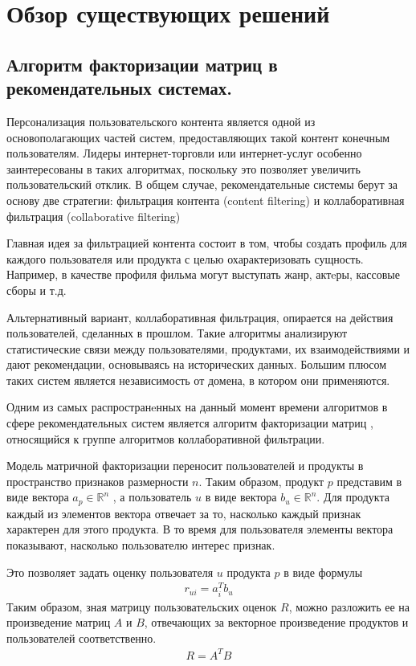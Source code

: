 \documentclass[times,specification,annotation]{itmo-student-thesis}
\begin{document}
\section{Обзор существующих решений}

\subsection{Алгоритм факторизации матриц в рекомендательных системах.}\label{sec:als}

Персонализация пользовательского контента является одной из основополагающих частей систем, предоставляющих такой контент конечным пользователям. Лидеры интернет-торговли или интернет-услуг особенно заинтересованы в таких алгоритмах, поскольку это позволяет увеличить пользовательский отклик.
В общем случае, рекомендательные системы берут за основу две стратегии: фильтрация контента (content filtering) \cite{Lops2011,} и коллаборативная фильтрация (collaborative filtering)
  
Главная идея за фильтрацией контента состоит в том, чтобы создать профиль для каждого пользователя или продукта с целью охарактеризовать сущность. Например, в качестве профиля фильма могут выступать жанр, актeры, кассовые сборы и т.д.

Альтернативный вариант, коллаборативная фильтрация, опирается на действия пользователей, сделанных в прошлом. Такие алгоритмы анализируют статистические связи между пользователями, продуктами, их взаимодействиями и дают рекомендации, основываясь на исторических данных.  Большим плюсом таких систем является независимость от домена, в котором они применяются.

Одним из самых распространeнных на данный момент времени алгоритмов в сфере рекомендательных систем является алгоритм факторизации матриц \cite{koren2009}, относящийся к группе алгоритмов коллаборативной фильтрации.

Модель матричной факторизации переносит пользователей и продукты в пространство признаков размерности $n$. Таким образом, продукт $p$ представим в виде вектора $a_{p} \in \mathbb{R}^n$ , а пользователь $u$ в виде вектора $b_{u} \in \mathbb{R}^n$. Для продукта каждый из элементов вектора отвечает за то, насколько каждый признак характерен для  этого продукта. В то время для пользователя элементы вектора показывают, насколько пользователю интерес признак.

Это позволяет задать оценку пользователя $u$ продукта $p$ в виде формулы
 \begin{align*}
r_{ui} = a_{i}^{T}b_{u}
\end{align*}
Таким образом, зная матрицу пользовательских оценок $R$, можно разложить ее на произведение матриц $A$ и $B$, отвечающих за векторное произведение продуктов и пользователей соответственно.
 \begin{align*}
R = A^TB
\end{align*}
\end{document}
